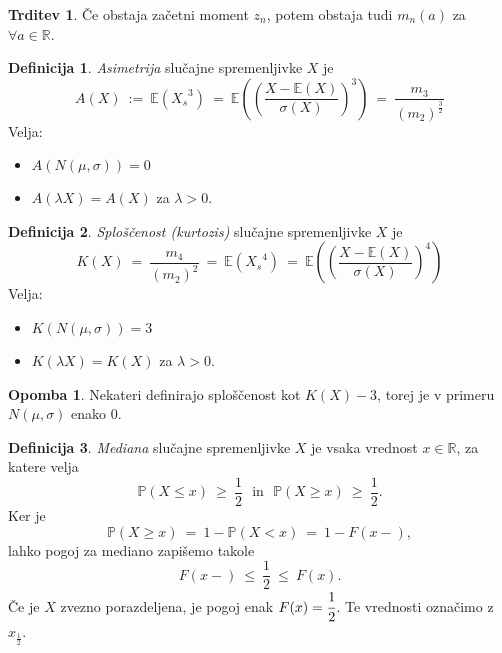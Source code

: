 \documentclass[11pt]{article}
\theoremstyle{definition}
\newtheorem{definicija}{Definicija}[section]
\theoremstyle{definition}
\newtheorem{trditev}{Trditev}[section]
\theoremstyle{definition}
\newtheorem*{opomba}{Opomba}
\begin{document}
\begin{trditev}

Če obstaja začetni moment $z_n$, potem obstaja tudi $m_n(a)$ za $\forall a \in \mathbb{R}$.

\end{trditev}
\vspace{0.5cm}

\begin{definicija}

\textit{Asimetrija} slučajne spremenljivke $X$ je 
$$A(X) ~:=~ \mathbb{E}({X_s}^3) ~=~ \mathbb{E}\left( \left( \frac{X - \mathbb{E}(X)}{\sigma(X)} \right)^3 \right) ~=~ \frac{m_3}{(m_2)^{\frac{3}{2}}}$$
Velja:
\begin{itemize}
	\item $A(N(\mu, \sigma)) = 0$
	\item $A(\lambda X) = A(X)$ za $\lambda > 0$.
\end{itemize}

\end{definicija}
\vspace{0.5cm}

\begin{definicija}

\textit{Sploščenost (kurtozis)} slučajne spremenljivke $X$ je
$$K(X) ~=~ \frac{m_4}{(m_2)^2} ~=~ \mathbb{E}({X_s}^4) ~=~ \mathbb{E}\left( \left( \frac{X - \mathbb{E}(X)}{\sigma(X)} \right)^4 \right)$$
Velja:
\begin{itemize}
	\item $K(N(\mu, \sigma)) = 3$
	\item $K(\lambda X) = K(X)$ za $\lambda > 0$.
\end{itemize}

\end{definicija}
\vspace{0.5cm}

\begin{opomba}

Nekateri definirajo sploščenost kot $K(X) - 3$, torej je v primeru $N(\mu, \sigma)$ enako $0$.

\end{opomba}
\vspace{0.5cm}

\begin{definicija}

\textit{Mediana}  slučajne spremenljivke $X$ je vsaka vrednost $x \in \mathbb{R}$, za katere velja
$$\mathbb{P}(X \leq x) ~\geq~ \frac{1}{2} ~~~\text{in}~~~ \mathbb{P}(X \geq x) ~\geq~ \frac{1}{2}.$$
Ker je 
$$\mathbb{P}(X \geq x) ~=~ 1 - \mathbb{P}(X < x) ~=~ 1 - F(x-),$$
lahko pogoj za mediano zapišemo takole
$$F(x-) ~\leq~ \frac{1}{2} ~\leq~ F(x).$$
Če je $X$ zvezno porazdeljena, je pogoj enak $F(x) = \cfrac{1}{2}$. Te vrednosti označimo z $x_{\frac{1}{2}}$.

\end{definicija}
\vspace{0.5cm}
\end{document}
